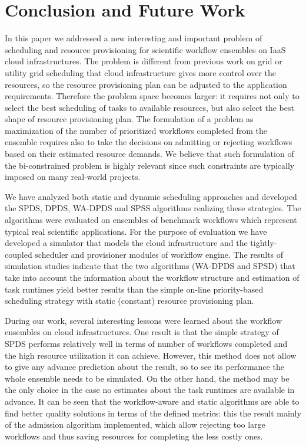 \documentclass{sig-alternate}
\begin{document}
\section{Conclusion and Future Work}
\label{sec:conclusions}

In this paper we addressed a new interesting and important problem of scheduling
and resource provisioning for scientific workflow ensembles on IaaS cloud
infrastructures. The problem is different from previous work on grid or utility
grid scheduling that cloud infrastructure gives more control over the resources,
so the resource provisioning plan can be adjusted to the application
requirements. Therefore the problem space becomes larger: it requires not
only to select the best scheduling of tasks to available resources, but also
select the best shape of resource provisioning plan. The formulation of a
problem as maximization of the number of prioritized workflows completed from
the ensemble requires also to take the decisions on admitting or rejecting workflows
based on their estimated resource demands. We believe that such formulation of
the bi-constrained problem is highly relevant since such
constraints are typically imposed on many real-world projects.

We have analyzed both static and dynamic scheduling approaches and
developed the SPDS, DPDS, WA-DPDS and SPSS algorithms realizing these
strategies. The algorithms were evaluated on ensembles of benchmark
workflows which represent typical real scientific applications. For the
purpose of evaluation we have developed a simulator that models the cloud
infrastructure and the tightly-coupled scheduler and provisioner modules of
workflow engine. The results of simulation studies indicate that the two algorithms (WA-DPDS and
SPSD) that take into account the information about the workflow structure and
estimation of task runtimes yield better results than the simple on-line
priority-based scheduling strategy with static (constant) resource provisioning
plan. 

During our work, several interesting lessons were learned about the workflow
ensembles on cloud infrastructures. One result is that the simple strategy of
SPDS performs relatively well in terms of number of workflows completed and the
high resource utilization it can achieve. However, this method does not allow to
give any advance prediction about the result, so to see its performance the
whole ensemble needs to be simulated. On the other hand, the method may be
the only choice in the case no estimates about the task runtimes are available
in advance. It can be seen that the workflow-aware and static algorithms are
able to find better quality solutions in terms of the defined metrics: this the
result mainly of the admission algorithm implemented, which allow rejecting too
large workflows and thus saving resources for completing the less costly ones.
\end{document}
